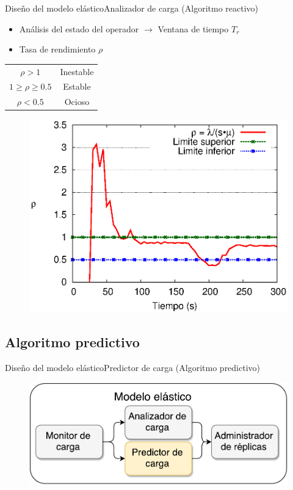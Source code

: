 \begin{frame}{Diseño del modelo elástico}{Analizador de carga (Algoritmo reactivo)}
\begin{itemize}
\item Análisis del estado del operador $\rightarrow$ Ventana de tiempo $T_r$
\item Tasa de rendimiento $\rho$
\end{itemize}
\hspace{1cm}
\begin{tabular}{c c}
	$\rho > 1$ & Inestable \\
	$1 \geqslant \rho \geqslant 0.5$ & Estable \\
	$\rho < 0.5$ & Ocioso
\end{tabular}

\begin{figure}[ht!]
  \centering
    \includegraphics[scale=0.5]{images/Umbrales.eps}
\end{figure}
\end{frame}

\subsection*{Algoritmo predictivo}
\begin{frame}{Diseño del modelo elástico}{Predictor de carga (Algoritmo predictivo)}
\begin{figure}
	\includegraphics[scale=0.5]{images/Modelo-vSlides-III.pdf}
\end{figure}
\end{frame}

